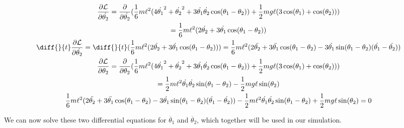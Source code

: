 \documentclass[]{article}
\begin{document}
\begin{gather*}
	\frac{\partial \lagr}{\partial \dot{\theta_2}} = \frac{\partial}{\partial \dot{\theta_2}}(\frac16m\ell^2(4\dot{\theta_1}^2 + \dot{\theta_2}^2 + 3\dot{\theta_1}\dot{\theta_2}\cos(\theta_1 - \theta_2)) + \frac12 mg\ell(3\cos(\theta_1) + \cos(\theta_2))) \\= \frac16m\ell^2(2\dot{\theta_2} + 3\dot{\theta_1}\cos(\theta_1 - \theta_2)) \\
	\diff{}{t}\frac{\partial \lagr}{\partial \dot{\theta_2}} = \diff{}{t}(\frac16m\ell^2(2\dot{\theta_2} + 3\dot{\theta_1}\cos(\theta_1 - \theta_2))) = \frac16m\ell^2(2\ddot{\theta_2} + 3\ddot{\theta_1}\cos(\theta_1 - \theta_2) - 3\dot{\theta_1}\sin(\theta_1 - \theta_2)(\dot{\theta_1} - \dot{\theta_2})) \\
	\frac{\partial \lagr}{\partial \theta_2} = \frac{\partial}{\partial \theta_2}(\frac16m\ell^2(4\dot{\theta_1}^2 + \dot{\theta_2}^2 + 3\dot{\theta_1}\dot{\theta_2}\cos(\theta_1 - \theta_2)) + \frac12 mg\ell(3\cos(\theta_1) + \cos(\theta_2))) \\
	= \frac12m\ell^2\dot{\theta_1}\dot{\theta_2}\sin(\theta_1 - \theta_2) - \frac12mg\ell\sin(\theta_2) \\
	\frac16m\ell^2(2\ddot{\theta_2} + 3\ddot{\theta_1}\cos(\theta_1 - \theta_2) - 3\dot{\theta_1}\sin(\theta_1 - \theta_2)(\dot{\theta_1} - \dot{\theta_2})) - \frac12m\ell^2\dot{\theta_1}\dot{\theta_2}\sin(\theta_1 - \theta_2) + \frac12mg\ell\sin(\theta_2) = 0
\end{gather*}

We can now solve these two differential equations for $\ddot{\theta_1}$ and $\ddot{\theta_2}$, which together will be used in our simulation.
\end{document}
